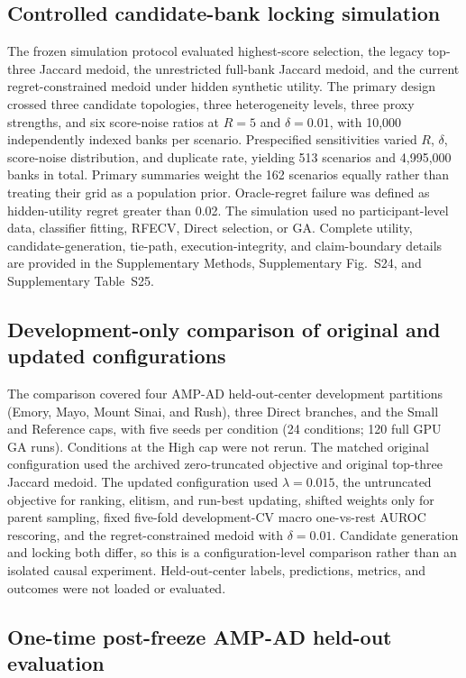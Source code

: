 \subsection{Controlled candidate-bank locking simulation}

The frozen simulation protocol evaluated highest-score selection, the legacy top-three Jaccard medoid, the unrestricted full-bank Jaccard medoid, and the current regret-constrained medoid under hidden synthetic utility. The primary design crossed three candidate topologies, three heterogeneity levels, three proxy strengths, and six score-noise ratios at $R=5$ and $\delta=0.01$, with 10,000 independently indexed banks per scenario. Prespecified sensitivities varied $R$, $\delta$, score-noise distribution, and duplicate rate, yielding 513 scenarios and 4,995,000 banks in total. Primary summaries weight the 162 scenarios equally rather than treating their grid as a population prior. Oracle-regret failure was defined as hidden-utility regret greater than 0.02. The simulation used no participant-level data, classifier fitting, RFECV, Direct selection, or GA. Complete utility, candidate-generation, tie-path, execution-integrity, and claim-boundary details are provided in the Supplementary Methods, Supplementary Fig.~S24, and Supplementary Table~S25.

\subsection{Development-only comparison of original and updated configurations}

The comparison covered four AMP-AD held-out-center development partitions (Emory, Mayo, Mount Sinai, and Rush), three Direct branches, and the Small and Reference caps, with five seeds per condition (24 conditions; 120 full GPU GA runs). Conditions at the High cap were not rerun. The matched original configuration used the archived zero-truncated objective and original top-three Jaccard medoid. The updated configuration used \(\lambda=0.015\), the untruncated objective for ranking, elitism, and run-best updating, shifted weights only for parent sampling, fixed five-fold development-CV macro one-vs-rest AUROC rescoring, and the regret-constrained medoid with \(\delta=0.01\). Candidate generation and locking both differ, so this is a configuration-level comparison rather than an isolated causal experiment. Held-out-center labels, predictions, metrics, and outcomes were not loaded or evaluated.

\subsection{One-time post-freeze AMP-AD held-out evaluation}

